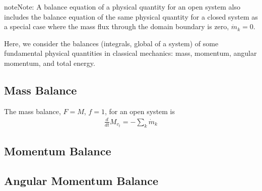 \documentclass[letterpaper,10pt,english]{jupyterBook}
\begin{document}
\begin{sphinxadmonition}{note}{Note:}
\sphinxAtStartPar
A balance equation of a physical quantity for an open system also includes the balance equation of the same physical quantity for a closed system as a special case where the mass flux through the domain boundary is zero, \(\dot{m}_k = 0\).
\end{sphinxadmonition}

\sphinxAtStartPar
Here, we consider the balances (integrals, global of a system) of some fundamental physical quantities in classical mechanics: mass, momentum, angular momentum, and total energy.


\subsection{Mass Balance}
\label{\detokenize{ch/principles-open:mass-balance}}
\sphinxAtStartPar
The mass balance, \(F = M\), \(f = 1\), for an open system is
\begin{equation*}
\begin{split}\frac{d}{dt} M_{v_t} = - \sum_k \dot{m}_k\end{split}
\end{equation*}

\subsection{Momentum Balance}
\label{\detokenize{ch/principles-open:momentum-balance}}
\sphinxAtStartPar
  


\subsection{Angular Momentum Balance}
\label{\detokenize{ch/principles-open:angular-momentum-balance}}
\sphinxAtStartPar
  
\end{document}

